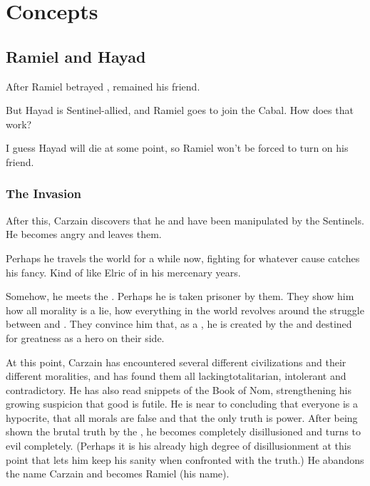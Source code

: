 \section{Concepts}









\subsection{Ramiel and Hayad}
After Ramiel betrayed \Belzir,  remained his friend. 

But Hayad is Sentinel-allied, and Ramiel goes to join the Cabal. 
How does that work? 

I guess Hayad will die at some point, so Ramiel won't be forced to turn on his friend. 







\subsubsection{The \Bane{} Invasion}

After this, Carzain discovers that he and \Belzir{} have been manipulated by the Sentinels. He becomes angry and leaves them. 

Perhaps he travels the world for a while now, fighting for whatever cause catches his fancy. Kind of like Elric of \Melnibone{} in his mercenary years. 

Somehow, he meets the \banes. Perhaps he is taken prisoner by them. They show him how all morality is a lie, how everything in the world revolves around the struggle between \dragons{} and \banes. They convince him that, as a \Malach, he is created by the \banes{} and destined for greatness as a hero on their side. 

At this point, Carzain has encountered several different civilizations and their different moralities, and has found them all lacking\dash{}totalitarian, intolerant and contradictory. He has also read snippets of the Book of Nom, strengthening his growing suspicion that good is futile. He is near to concluding that everyone is a hypocrite, that all morals are false and that the only truth is power. 
After being shown the brutal truth by the \banes, he becomes completely disillusioned and turns to evil completely. (Perhaps it is his already high degree of disillusionment at this point that lets him keep his sanity when confronted with the truth.) 
He abandons the name Carzain \Shireyo{} and becomes Ramiel (his \Malach{} name). 

